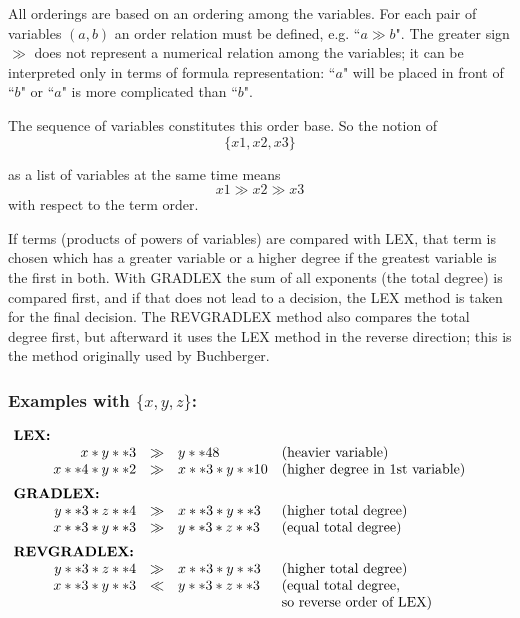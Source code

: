 All orderings are based on an ordering among the variables. For
each pair of variables $(a,b)$ an order relation must be defined, e.g.
``$ a\gg b $". The greater sign $\gg$  does not represent a numerical
relation among the variables; it can be interpreted only in terms of
formula representation: ``$a$" will be placed in front of ``$b$" or
``$a$"  is more complicated than ``$b$".

The sequence of variables constitutes this order base. So the notion
of
\[
\{x1,x2,x3\}
\]

as a list of variables at the same time means
\[
x1 \gg x2 \gg x3
\]
with respect to the term order.

If terms (products of powers of variables) are compared with LEX,
that term is chosen which has a greater variable or a higher degree
if the greatest variable is the first in both. With GRADLEX the sum of
all exponents (the total degree) is compared first, and if that does
not lead to a decision, the LEX method is taken for the final decision.
The REVGRADLEX method also compares the total degree first, but
afterward it uses the LEX method in the reverse direction; this is the
method originally used by Buchberger.

\subsubsection*{Examples with $\{x,y,z\}$:}
\[
\begin{array}{rlll}
\multicolumn{2}{l}{\hspace*{-1cm}\mbox{\bf LEX:}}\\
 x * y **3 & \gg & y ** 48 & \mbox{(heavier variable)} \\
 x**4 * y**2 & \gg  & x**3 * y**10 & \mbox{(higher degree in 1st
variable)} \vspace*{2mm} \\
\multicolumn{2}{l}{\hspace*{-1cm}\mbox{\bf GRADLEX:}} \\
  y**3 * z**4 & \gg & x**3 * y**3 & \mbox{(higher total degree)} \\
  x**3 * y**3  & \gg & y**3 * z**3  & \mbox{(equal total degree)}
\vspace*{2mm}\\
\multicolumn{2}{l}{\hspace*{-1cm}\mbox{\bf
REVGRADLEX:}} \\
 y**3 * z**4 & \gg &  x**3 * y**3 & \mbox{(higher total degree)} \\
 x**3 * y**3 & \ll  &  y**3 * z**3  & \mbox{(equal total degree,} \\
 & & & \mbox{so reverse order of LEX)}
\end{array}
\]


